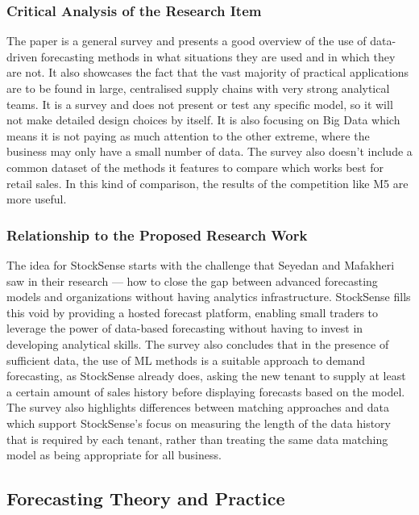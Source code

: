 \documentclass{StockSense}
\begin{document}
\subsubsection{Critical Analysis of the Research Item}

The paper is a general survey and presents a good overview of the use of data-driven forecasting methods in what situations they are used and in which they are not. It also showcases the fact that the vast majority of practical applications are to be found in large, centralised supply chains with very strong analytical teams. It is a survey and does not present or test any specific model, so it will not make detailed design choices by itself. It is also focusing on Big Data which means it is not paying as much attention to the other extreme, where the business may only have a small number of data. The survey also doesn't include a common dataset of the methods it features to compare which works best for retail sales. In this kind of comparison, the results of the competition like M5 are more useful.

\subsubsection{Relationship to the Proposed Research Work}

The idea for StockSense starts with the challenge that Seyedan and Mafakheri saw in their research --- how to close the gap between advanced forecasting models and organizations without having analytics infrastructure. StockSense fills this void by providing a hosted forecast platform, enabling small traders to leverage the power of data-based forecasting without having to invest in developing analytical skills. The survey also concludes that in the presence of sufficient data, the use of ML methods is a suitable approach to demand forecasting, as StockSense already does, asking the new tenant to supply at least a certain amount of sales history before displaying forecasts based on the model. The survey also highlights differences between matching approaches and data which support StockSense's focus on measuring the length of the data history that is required by each tenant, rather than treating the same data matching model as being appropriate for all business.

\subsection{Forecasting Theory and Practice}
\end{document}
